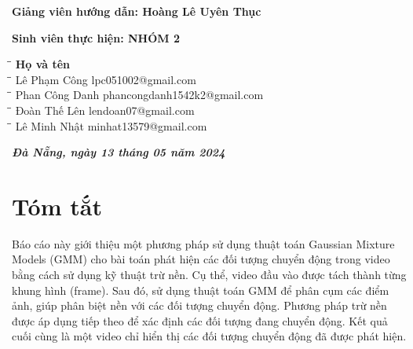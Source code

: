 \documentclass[a4paper]{article}
\begin{document}
\begin{titlepage}
\vspace{50pt}
\begin{addmargin}[1cm]{0cm}
\textbf{Giảng viên hướng dẫn: \hspace{2cm}Hoàng Lê Uyên Thục}
\end{addmargin}
\vspace{10pt}
\begin{addmargin}[1cm]{0cm}
\textbf{Sinh viên thực hiện: \hspace{2.6cm}NHÓM 2}
\begin{tabbing}
\hspace{4cm}\=\hspace{3cm}\=\hspace{5cm} \kill
{\textbf{Họ và tên}}\\
\hspace{4cm}\=\hspace{3cm}\=\hspace{5cm} \kill
Lê Phạm Công\> lpc051002@gmail.com\\
\hspace{4cm}\=\hspace{3cm}\=\hspace{5cm} \kill
Phan Công Danh\> phancongdanh1542k2@gmail.com\\
\hspace{4cm}\=\hspace{3cm}\=\hspace{5cm} \kill
Đoàn Thế Lên\> lendoan07@gmail.com\\
\hspace{4cm}\=\hspace{3cm}\=\hspace{5cm} \kill
Lê Minh Nhật\> minhat13579@gmail.com\\
\end{tabbing}
\end{addmargin}
\vspace{0cm}
\begin{center}
    \textit{\textbf{Đà Nẵng, ngày 13 tháng 05 năm 2024}}
\end{center}
\end{titlepage}
\newpage
\tableofcontents
\newpage

\section*{Tóm tắt}
Báo cáo này giới thiệu một phương pháp sử dụng thuật toán Gaussian Mixture Models (GMM) cho bài toán phát hiện các đối tượng chuyển động trong video bằng cách sử dụng kỹ thuật trừ nền. Cụ thể, video đầu vào được tách thành từng khung hình (frame). Sau đó, sử dụng thuật toán GMM để phân cụm các điểm ảnh, giúp phân biệt nền với các đối tượng chuyển động. Phương pháp trừ nền được áp dụng tiếp theo để xác định các đối tượng đang chuyển động. Kết quả cuối cùng là một video chỉ hiển thị các đối tượng chuyển động đã được phát hiện.
\end{document}
